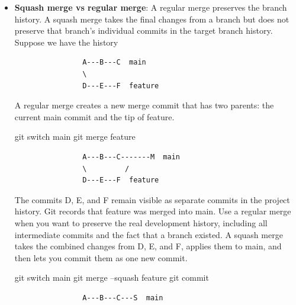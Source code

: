 \documentclass{report}
\begin{document}
\begin{itemize}
\begin{bashcode}
            \end{bashcode}
            \bigbreak \noindent 
            This deletes the branch pointer, not necessarily the commits. If the commits are already reachable from another branch, such as main, they are still part of history.
            \bigbreak \noindent 
            \begin{bashcode}
                git branch -D feature-login
            \end{bashcode}
            \bigbreak \noindent 
            This deletes the branch even if Git thinks it has unmerged work.
        \item \textbf{Squash merge vs regular merge}: A regular merge preserves the branch history. A squash merge takes the final changes from a branch but does not preserve that branch’s individual commits in the target branch history. 
            \bigbreak \noindent 
            Suppose we have the history
            \bigbreak \noindent 
            \begin{verbatim}
                A---B---C  main
                \
                D---E---F  feature 
            \end{verbatim}
            \bigbreak \noindent 
            A regular merge creates a new merge commit that has two parents: the current main commit and the tip of feature.
            \bigbreak \noindent 
            \begin{bashcode}
                git switch main
                git merge feature
            \end{bashcode}
            \bigbreak \noindent 
            \begin{verbatim}
                A---B---C-------M  main
                \         /
                D---E---F  feature
            \end{verbatim}
            \bigbreak \noindent 
            The commits D, E, and F remain visible as separate commits in the project history. Git records that feature was merged into main.
            \bigbreak \noindent 
            Use a regular merge when you want to preserve the real development history, including all intermediate commits and the fact that a branch existed.
            \bigbreak \noindent 
            A squash merge takes the combined changes from D, E, and F, applies them to main, and then lets you commit them as one new commit.
            \bigbreak \noindent 
            \begin{bashcode}
                git switch main
                git merge --squash feature
                git commit
            \end{bashcode}
            \bigbreak \noindent 
            \begin{verbatim}
                A---B---C---S  main


\end{verbatim}
\end{itemize}
\end{document}
